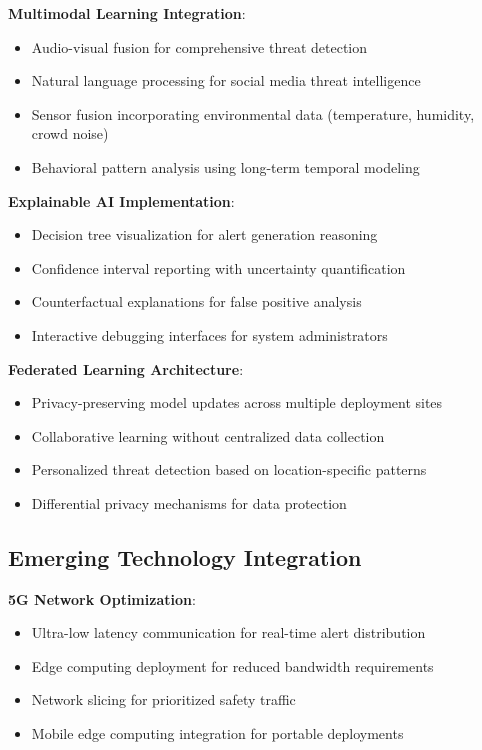 \documentclass[12pt,a4paper]{article}
\begin{document}
\textbf{Multimodal Learning Integration}:
\begin{itemize}
    \item Audio-visual fusion for comprehensive threat detection
    \item Natural language processing for social media threat intelligence
    \item Sensor fusion incorporating environmental data (temperature, humidity, crowd noise)
    \item Behavioral pattern analysis using long-term temporal modeling
\end{itemize}

\textbf{Explainable AI Implementation}:
\begin{itemize}
    \item Decision tree visualization for alert generation reasoning
    \item Confidence interval reporting with uncertainty quantification
    \item Counterfactual explanations for false positive analysis
    \item Interactive debugging interfaces for system administrators
\end{itemize}

\textbf{Federated Learning Architecture}:
\begin{itemize}
    \item Privacy-preserving model updates across multiple deployment sites
    \item Collaborative learning without centralized data collection
    \item Personalized threat detection based on location-specific patterns
    \item Differential privacy mechanisms for data protection
\end{itemize}

\subsection{Emerging Technology Integration}

\textbf{5G Network Optimization}:
\begin{itemize}
    \item Ultra-low latency communication for real-time alert distribution
    \item Edge computing deployment for reduced bandwidth requirements
    \item Network slicing for prioritized safety traffic
    \item Mobile edge computing integration for portable deployments
\end{itemize}
\end{document}
